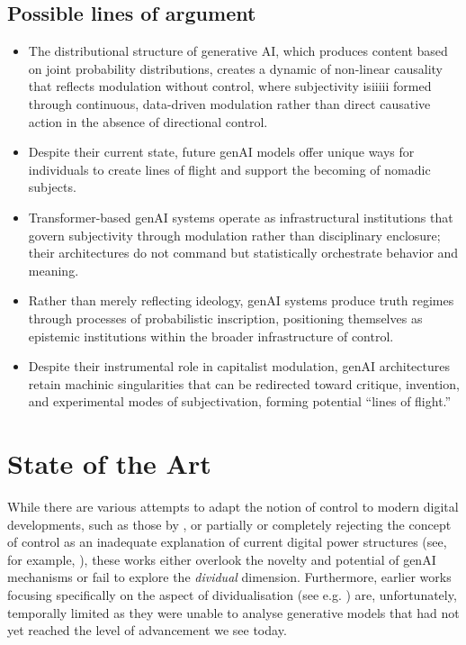 \subsection{Possible lines of argument}
\begin{itemize}
	\item The distributional structure of generative AI, which produces content based on joint probability distributions, creates a dynamic of non-linear causality that reflects modulation without control, where subjectivity isiiiii formed through continuous, data-driven modulation rather than direct causative action in the absence of directional control. %
	\item Despite their current state, future genAI models
	      offer unique ways for individuals to create lines of
	      flight and support the becoming of nomadic subjects. %
	\item Transformer-based genAI systems operate as infrastructural institutions that govern subjectivity through modulation rather than disciplinary enclosure; their architectures do not command but statistically orchestrate behavior and meaning.
	\item Rather than merely reflecting ideology, genAI systems produce truth regimes through processes of probabilistic inscription, positioning themselves as epistemic institutions within the broader infrastructure of control.
	\item Despite their instrumental role in capitalist modulation, genAI architectures retain machinic singularities that can be redirected toward critique, invention, and experimental modes of subjectivation, forming potential “lines of flight.”
\end{itemize}


\section{State of the Art}

While there are various attempts to adapt the notion of control to modern
digital developments, such as those by \cite{brusseau2020}, or partially or completely rejecting the concept of control as an inadequate explanation of current digital power structures (see, for example, \cite{hui2015}), these works either overlook the novelty and potential of genAI mechanisms or fail to explore the \textit{dividual} dimension.  Furthermore, earlier works focusing specifically on the aspect of dividualisation (see e.g. \cite{Cheney2011, Otterlo2013}) are, unfortunately, temporally limited as they were unable to analyse generative models that had not yet reached the level of advancement we see today.

